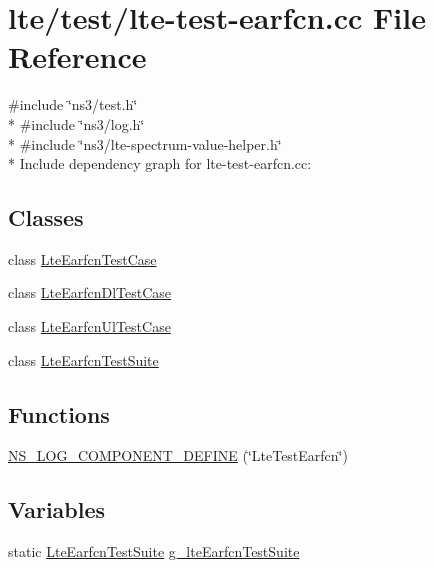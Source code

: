 \hypertarget{lte-test-earfcn_8cc}{}\section{lte/test/lte-\/test-\/earfcn.cc File Reference}
\label{lte-test-earfcn_8cc}
{\ttfamily \#include \char`\"{}ns3/test.\+h\char`\"{}}\\*
{\ttfamily \#include \char`\"{}ns3/log.\+h\char`\"{}}\\*
{\ttfamily \#include \char`\"{}ns3/lte-\/spectrum-\/value-\/helper.\+h\char`\"{}}\\*
Include dependency graph for lte-\/test-\/earfcn.cc\+:
\subsection*{Classes}
\begin{DoxyCompactItemize}
\item 
class \hyperlink{classLteEarfcnTestCase}{Lte\+Earfcn\+Test\+Case}
\item 
class \hyperlink{classLteEarfcnDlTestCase}{Lte\+Earfcn\+Dl\+Test\+Case}
\item 
class \hyperlink{classLteEarfcnUlTestCase}{Lte\+Earfcn\+Ul\+Test\+Case}
\item 
class \hyperlink{classLteEarfcnTestSuite}{Lte\+Earfcn\+Test\+Suite}
\end{DoxyCompactItemize}
\subsection*{Functions}
\begin{DoxyCompactItemize}
\item 
\hyperlink{lte-test-earfcn_8cc_ae76a3f52791cf9fde92a6bd7c6992806}{N\+S\+\_\+\+L\+O\+G\+\_\+\+C\+O\+M\+P\+O\+N\+E\+N\+T\+\_\+\+D\+E\+F\+I\+NE} (\char`\"{}Lte\+Test\+Earfcn\char`\"{})
\end{DoxyCompactItemize}
\subsection*{Variables}
\begin{DoxyCompactItemize}
\item 
static \hyperlink{classLteEarfcnTestSuite}{Lte\+Earfcn\+Test\+Suite} \hyperlink{lte-test-earfcn_8cc_ab2e84db781406017fa93c86b5a9ea4c4}{g\+\_\+lte\+Earfcn\+Test\+Suite}
\end{DoxyCompactItemize}


